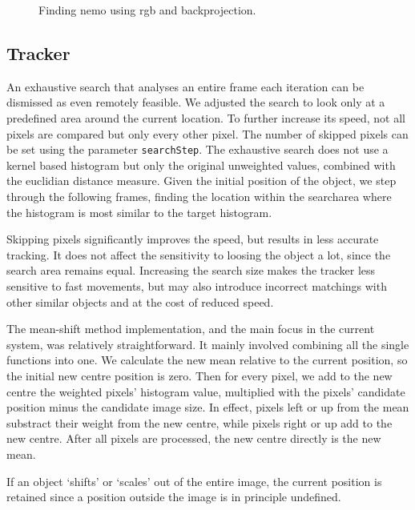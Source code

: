 \documentclass[a4paper,11pt]{article}
\begin{document}
\begin{figure}[ht]
  \centering
  \caption{Finding nemo using rgb and backprojection.}
  \label{fig:nemo}
\end{figure}

\subsection{Tracker}
\label{sec:application:tracker}
An exhaustive search that analyses an entire frame each iteration can be dismissed as even remotely feasible.
We adjusted the search to look only at a predefined area around the current location.
To further increase its speed, not all pixels are compared but only every other pixel.
The number of skipped pixels can be set using the parameter \texttt{searchStep}.
The exhaustive search does not use a kernel based histogram but only the original unweighted values, combined with the euclidian distance measure.
Given the initial position of the object, we step through the following frames, finding the location within the searcharea where the histogram is most similar to the target histogram.

Skipping pixels significantly improves the speed, but results in less accurate tracking.
It does not affect the sensitivity to loosing the object a lot, since the search area remains equal.
Increasing the search size makes the tracker less sensitive to fast movements, but may also introduce incorrect matchings with other similar objects and at the cost of reduced speed.

The mean-shift method implementation, and the main focus in the current system, was relatively straightforward.
It mainly involved combining all the single functions into one.
We calculate the new mean relative to the current position, so the initial new centre position is zero.
Then for every pixel, we add to the new centre the weighted pixels' histogram value, multiplied with the pixels' candidate position minus the candidate image size.
In effect, pixels left or up from the mean substract their weight from the new centre, while pixels right or up add to the new centre.
After all pixels are processed, the new centre directly is the new mean.

If an object `shifts' or `scales' out of the entire image, the current position is retained since a position outside the image is in principle undefined.
\end{document}
